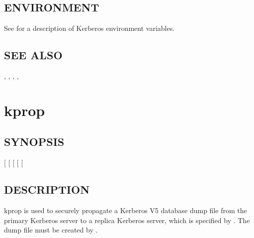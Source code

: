 \documentclass[letterpaper,10pt,english]{sphinxmanual}
\begin{document}
\subsection{ENVIRONMENT}
\label{\detokenize{admin/admin_commands/krb5kdc:environment}}
See  for a description of Kerberos environment
variables.


\subsection{SEE ALSO}
\label{\detokenize{admin/admin_commands/krb5kdc:see-also}}
{\hyperref[\detokenize{admin/admin_commands/kdb5_util:kdb5-util-8}]{}}, {\hyperref[\detokenize{admin/conf_files/kdc_conf:kdc-conf-5}]{}}, {\hyperref[\detokenize{admin/conf_files/krb5_conf:krb5-conf-5}]{}},
{\hyperref[\detokenize{admin/admin_commands/kdb5_ldap_util:kdb5-ldap-util-8}]{}}, 


\section{kprop}
\label{\detokenize{admin/admin_commands/kprop:kprop-8}}\label{\detokenize{admin/admin_commands/kprop::doc}}\label{\detokenize{admin/admin_commands/kprop:kprop}}

\subsection{SYNOPSIS}
\label{\detokenize{admin/admin_commands/kprop:synopsis}}
{[} \sphinxstyleemphasis{realm}{]}
{[} \sphinxstyleemphasis{file}{]}
{[}\sphinxstylestrong{-d}{]}
{[} \sphinxstyleemphasis{port}{]}
{[} \sphinxstyleemphasis{keytab}{]}


\subsection{DESCRIPTION}
\label{\detokenize{admin/admin_commands/kprop:description}}
kprop is used to securely propagate a Kerberos V5 database dump file
from the primary Kerberos server to a replica Kerberos server, which is
specified by .  The dump file must be created by
{\hyperref[\detokenize{admin/admin_commands/kdb5_util:kdb5-util-8}]{}}.
\end{document}
